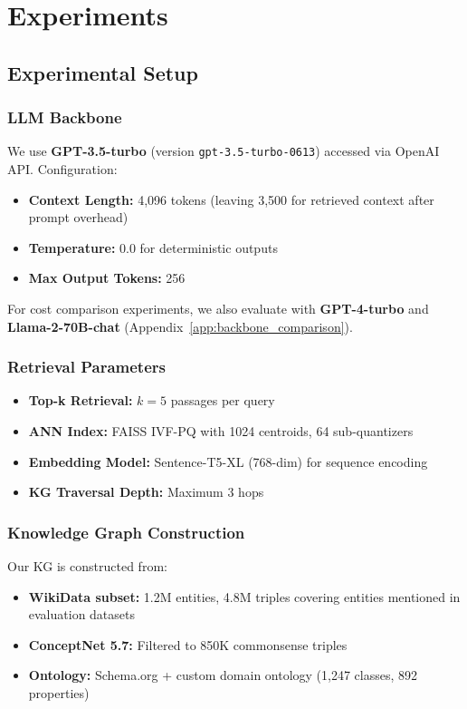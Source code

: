 \documentclass[conference]{IEEEtran}
\begin{document}
\section{Experiments}

\subsection{Experimental Setup}

\subsubsection{LLM Backbone}
\label{sec:llm_backbone}

We use \textbf{GPT-3.5-turbo} (version \texttt{gpt-3.5-turbo-0613}) accessed via OpenAI API. Configuration:
\begin{itemize}[leftmargin=*]
    \item \textbf{Context Length:} 4,096 tokens (leaving 3,500 for retrieved context after prompt overhead)
    \item \textbf{Temperature:} 0.0 for deterministic outputs
    \item \textbf{Max Output Tokens:} 256
\end{itemize}

For cost comparison experiments, we also evaluate with \textbf{GPT-4-turbo} and \textbf{Llama-2-70B-chat} (Appendix~\ref{app:backbone_comparison}).

\subsubsection{Retrieval Parameters}

\begin{itemize}[leftmargin=*]
    \item \textbf{Top-k Retrieval:} $k=5$ passages per query
    \item \textbf{ANN Index:} FAISS IVF-PQ with 1024 centroids, 64 sub-quantizers
    \item \textbf{Embedding Model:} Sentence-T5-XL (768-dim) for sequence encoding
    \item \textbf{KG Traversal Depth:} Maximum 3 hops
\end{itemize}

\subsubsection{Knowledge Graph Construction}

Our KG is constructed from:
\begin{itemize}[leftmargin=*]
    \item \textbf{WikiData subset:} 1.2M entities, 4.8M triples covering entities mentioned in evaluation datasets
    \item \textbf{ConceptNet 5.7:} Filtered to 850K commonsense triples
    \item \textbf{Ontology:} Schema.org + custom domain ontology (1,247 classes, 892 properties)
\end{itemize}
\end{document}
